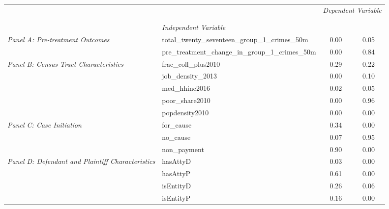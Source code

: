 \begin{tabular}{llcc}
\toprule
 &  & \multicolumn{2}{c}{\textit{Dependent Variable}} \\
\cline{3-4}
\\
 &  &  &  \\
 & \emph{Independent Variable} &  &  \\
\midrule
\multirow[c]{2}{3cm}{\textit{Panel A: Pre-treatment Outcomes}} & total_twenty_seventeen_group_1_crimes_50m & 0.00 & 0.05 \\
 & pre_treatment_change_in_group_1_crimes_50m & 0.00 & 0.84 \\
\cline{1-4}
\multirow[c]{5}{3cm}{\textit{Panel B: Census Tract Characteristics}} & frac_coll_plus2010 & 0.29 & 0.22 \\
 & job_density_2013 & 0.00 & 0.10 \\
 & med_hhinc2016 & 0.02 & 0.05 \\
 & poor_share2010 & 0.00 & 0.96 \\
 & popdensity2010 & 0.00 & 0.00 \\
\cline{1-4}
\multirow[c]{3}{3cm}{\textit{Panel C: Case Initiation}} & for_cause & 0.34 & 0.00 \\
 & no_cause & 0.07 & 0.95 \\
 & non_payment & 0.90 & 0.00 \\
\cline{1-4}
\multirow[c]{4}{3cm}{\textit{Panel D: Defendant and Plaintiff Characteristics}} & hasAttyD & 0.03 & 0.00 \\
 & hasAttyP & 0.61 & 0.00 \\
 & isEntityD & 0.26 & 0.06 \\
 & isEntityP & 0.16 & 0.00 \\
\cline{1-4}
\bottomrule
\end{tabular}
